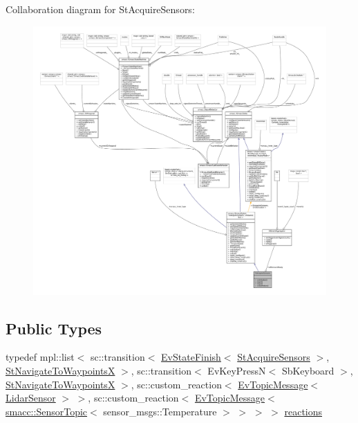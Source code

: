 Collaboration diagram for St\+Acquire\+Sensors\+:
\nopagebreak
\begin{figure}[H]
\begin{center}
\leavevmode
\includegraphics[width=350pt]{structStAcquireSensors__coll__graph}
\end{center}
\end{figure}
\subsection*{Public Types}
\begin{DoxyCompactItemize}
\item 
typedef mpl\+::list$<$ sc\+::transition$<$ \hyperlink{structsmacc_1_1EvStateFinish}{Ev\+State\+Finish}$<$ \hyperlink{structStAcquireSensors}{St\+Acquire\+Sensors} $>$, \hyperlink{structStNavigateToWaypointsX}{St\+Navigate\+To\+WaypointsX} $>$, sc\+::transition$<$ Ev\+Key\+PressN$<$ Sb\+Keyboard $>$, \hyperlink{structStNavigateToWaypointsX}{St\+Navigate\+To\+WaypointsX} $>$, sc\+::custom\+\_\+reaction$<$ \hyperlink{structsmacc_1_1EvTopicMessage}{Ev\+Topic\+Message}$<$ \hyperlink{sensor__state_8h_a9db9e1944f88de79507758d08e4a2ee3}{Lidar\+Sensor} $>$ $>$, sc\+::custom\+\_\+reaction$<$ \hyperlink{structsmacc_1_1EvTopicMessage}{Ev\+Topic\+Message}$<$ \hyperlink{classsmacc_1_1SensorTopic}{smacc\+::\+Sensor\+Topic}$<$ sensor\+\_\+msgs\+::\+Temperature $>$ $>$ $>$ $>$ \hyperlink{structStAcquireSensors_a2e405e02a34cab31c6c05351e092e235}{reactions}
\end{DoxyCompactItemize}
